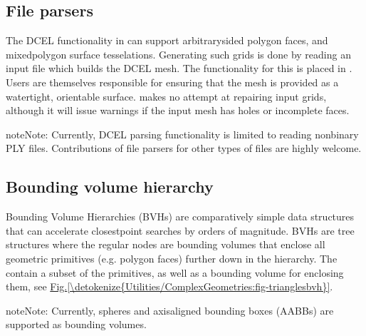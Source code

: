 \documentclass[letterpaper,10pt,english]{sphinxmanual}
\begin{document}
\subsection{File parsers}
\label{\detokenize{Utilities/ComplexGeometries:file-parsers}}\label{\detokenize{Utilities/ComplexGeometries:chap-dcelparser}}
The DCEL functionality in  can support arbitrary\sphinxhyphen{}sided polygon faces, and mixed\sphinxhyphen{}polygon surface tesselations.
Generating such grids is done by reading an input file which builds the DCEL mesh.
The functionality for this is placed in .
Users are themselves responsible for ensuring that the mesh is provided as a watertight, orientable surface.
 makes no attempt at repairing input grids, although it will issue warnings if the input mesh has holes or incomplete faces.

\begin{sphinxadmonition}{note}{Note:}
Currently, DCEL parsing functionality is limited to reading non\sphinxhyphen{}binary PLY files.
Contributions of file parsers for other types of files are highly welcome.
\end{sphinxadmonition}


\subsection{Bounding volume hierarchy}
\label{\detokenize{Utilities/ComplexGeometries:bounding-volume-hierarchy}}\label{\detokenize{Utilities/ComplexGeometries:chap-bvh}}
Bounding Volume Hierarchies (BVHs) are comparatively simple data structures that can accelerate closest\sphinxhyphen{}point searches by orders of magnitude.
BVHs are tree structures where the regular nodes are bounding volumes that enclose all geometric primitives (e.g. polygon faces) further down in the hierarchy.
The  contain a subset of the primitives, as well as a bounding volume for enclosing them, see \hyperref[\detokenize{Utilities/ComplexGeometries:fig-trianglesbvh}]{Fig.\@ \ref{\detokenize{Utilities/ComplexGeometries:fig-trianglesbvh}}}.

\begin{sphinxadmonition}{note}{Note:}
Currently, spheres and axis\sphinxhyphen{}aligned bounding boxes (AABBs) are supported as bounding volumes.
\end{sphinxadmonition}
\end{document}
